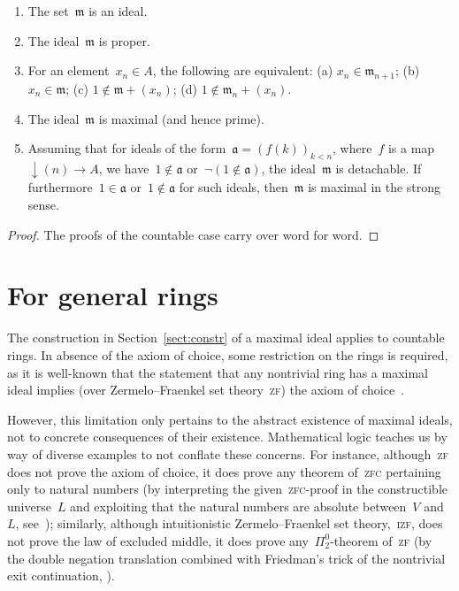 \documentclass[envcountsect,envcountsame,runningheads]{llncs}
\newcommand{\aaa}{\mathfrak{a}}
\newcommand{\mmm}{\mathfrak{m}}
\renewcommand{\_}{\mathpunct{.}\,}
\begin{document}
\begin{proposition}\begin{enumerate}
\item The set~$\mmm$ is an ideal.
\item The ideal~$\mmm$ is proper.
\item For an element~$x_n \in A$, the following are equivalent: (a) $x_n \in
\mmm_{n+1}$; (b) $x_n \in \mmm$; (c) $1 \not\in \mmm + (x_n)$; (d) $1 \not \in \mmm_n + (x_n)$.
\item The ideal~$\mmm$ is maximal (and hence prime).
\item Assuming that for ideals of the form~$\aaa = (f(k))_{k < n}$, where~$f$
is a map~${\downarrow(n)} \to A$, we have~$1 \not\in \aaa$ or~$\neg(1
\not\in \aaa)$, the ideal~$\mmm$ is detachable. If furthermore~$1 \in \aaa$
or~$1 \not\in \aaa$ for such ideals, then~$\mmm$ is maximal in the
strong sense.
\end{enumerate}
\end{proposition}

\begin{proof}The proofs of the countable case carry over word for word.
\end{proof}


\section{For general rings}
\label{sect:wlog}

The construction in Section~\ref{sect:constr} of a maximal ideal applies to
countable rings. In absence of the axiom of choice, some restriction on the
rings is required, as it is well-known that the statement that any nontrivial
ring has a maximal ideal implies (over Zermelo--Fraenkel set
theory~\textsc{zf}) the axiom of choice~\cite{hodges:krull,banaschewski:krull,erne:krull}.

However, this limitation only pertains to the abstract existence of maximal
ideals, not to concrete consequences of their existence. Mathematical
logic teaches us by way of diverse examples to not conflate these concerns. For
instance, although~\textsc{zf} does not prove the axiom of choice, it does
prove any theorem of~\textsc{zfc} pertaining only to natural numbers (by
interpreting the given~\textsc{zfc}-proof in the constructible universe~$L$
and exploiting that the natural numbers are absolute between~$V$ and~$L$,
see~\cite{???}); similarly, although intuitionistic Zermelo--Fraenkel set
theory,~\textsc{izf}, does not prove the law of excluded middle, it does prove
any~$\Pi^0_2$-theorem of~\textsc{zf} (by the double negation translation
combined with Friedman's trick of the nontrivial exit continuation,
\cite{???}).
\end{document}
